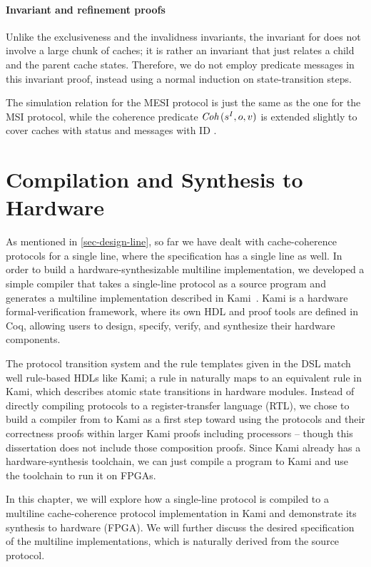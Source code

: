 \subsubsection{Invariant and refinement proofs}

Unlike the exclusiveness and the invalidness invariants, the invariant for \stE{} does not involve a large chunk of caches; it is rather an invariant that just relates a child and the parent cache states.
Therefore, we do not employ predicate messages in this invariant proof, instead using a normal induction on state-transition steps.

The simulation relation for the MESI protocol is just the same as the one for the MSI protocol, while the coherence predicate $\textit{Coh}\,(s^I, o, v)$ is extended slightly to cover caches with \stE{} status and messages with ID .

\chapter{Compilation and Synthesis to Hardware}
\label{sec-comp-syn}

As mentioned in \autoref{sec-design-line}, so far we have dealt with cache-coherence protocols for a single line, where the specification has a single line as well.
In order to build a hardware-synthesizable multiline implementation, we developed a simple compiler that takes a single-line \hemiola{} protocol as a source program and generates a multiline implementation described in Kami~\cite{kami}.
Kami is a hardware formal-verification framework, where its own HDL and proof tools are defined in Coq, allowing users to design, specify, verify, and synthesize their hardware components.

The protocol transition system and the rule templates given in the \hemiola{} DSL match well rule-based HDLs like Kami; a rule in \hemiola{} naturally maps to an equivalent rule in Kami, which describes atomic state transitions in hardware modules.
Instead of directly compiling \hemiola{} protocols to a register-transfer language (RTL), we chose to build a compiler from \hemiola{} to Kami as a first step toward using the protocols and their correctness proofs within larger Kami proofs including processors -- though this dissertation does not include those composition proofs.
Since Kami already has a hardware-synthesis toolchain, we can just compile a \hemiola{} program to Kami and use the toolchain to run it on FPGAs.

In this chapter, we will explore how a single-line \hemiola{} protocol is compiled to a multiline cache-coherence protocol implementation in Kami and demonstrate its synthesis to hardware (FPGA).
We will further discuss the desired specification of the multiline implementations, which is naturally derived from the source \hemiola{} protocol.

